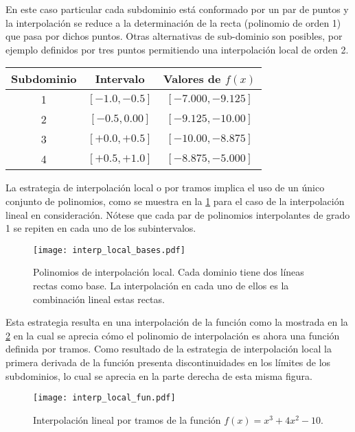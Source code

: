En este caso particular cada subdominio está conformado por un par de puntos y la interpolación se reduce a la determinación de la recta (polinomio de orden 1) que pasa por dichos puntos. Otras alternativas de sub-dominio son posibles, por ejemplo definidos por tres puntos permitiendo una interpolación local de orden 2.
\begin{center}
\begin{tabular}{ccc}
  \hline
  Subdominio & Intervalo & Valores de $f(x)$ \\
  \hline 
   1  & $[-1.0, -0.5]$ & $[-7.000, -9.125]$  \\
   2  & $[-0.5,  0.00]$ & $[-9.125, -10.00]$  \\
   3  & $[+0.0,  +0.5]$ & $[-10.00, -8.875]$   \\
   4  & $[+0.5, +1.0]$ & $[-8.875, -5.000]$   \\
  \hline
\end{tabular}
\label{tab:subdominio}
\end{center}

La estrategia de interpolación local o por tramos implica el uso de un único conjunto de polinomios, como se muestra en la \cref{fig:interp_local_bases} para el caso de la interpolación lineal en consideración. Nótese que cada par de polinomios interpolantes de grado 1 se repiten en cada uno de los subintervalos.
\begin{figure}[H]
  \centering
  \texttt{[image: interp\_local\_bases.pdf]}
  \caption{Polinomios de interpolación local. Cada dominio tiene dos líneas rectas como base. La interpolación en cada uno de ellos es la combinación lineal estas rectas.}
  \label{fig:interp_local_bases}
\end{figure}


Esta estrategia resulta en una interpolación de la función como la mostrada en la \cref{fig:interp_local_fun} en la cual se aprecia cómo el polinomio de interpolación es ahora una función definida por tramos. Como resultado de la estrategia de interpolación local la primera derivada de la función presenta discontinuidades en los límites de los subdominios, lo cual se aprecia en la parte derecha de esta misma figura. 
\begin{figure}[H]
  \centering
  \texttt{[image: interp\_local\_fun.pdf]}
  \caption{Interpolación lineal por tramos de la función $f(x) = {x^3} + 4{x^2} - 10$.}
  \label{fig:interp_local_fun}
\end{figure}

